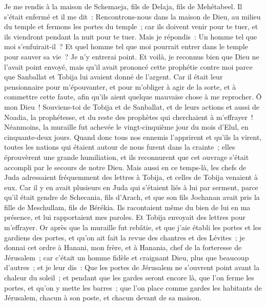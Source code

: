 \begin{multicols}{2}
Je me rendis à la maison de Schemaeja, fils de Delaja, fils de Mehétabeel. Il s'était enfermé et il me dit~: Rencontrons-nous dans la maison de Dieu, au milieu du temple et fermons les portes du temple~; car ils doivent venir pour te tuer, et ils viendront pendant la nuit pour te tuer.
Mais je répondis~: Un homme tel que moi s'enfuirait-il~? Et quel homme tel que moi pourrait entrer dans le temple pour sauver sa vie~? Je n'y entrerai point.
Et voilà, je reconnus bien que Dieu ne l'avait point envoyé, mais qu'il avait prononcé cette prophétie contre moi parce que Sanballat et Tobija lui avaient donné de l'argent.
Car il était leur pensionnaire pour m'épouvanter, et pour m'obliger à agir de la sorte, et à commettre cette faute, afin qu'ils aient quelque mauvaise chose à me reprocher.
Ô mon Dieu~! Souviens-toi de Tobija et de Sanballat, et de leurs actions et aussi de Noadia, la prophétesse, et du reste des prophètes qui cherchaient à m'effrayer~!
Néanmoins, la muraille fut achevée le vingt-cinquième jour du mois d'Elul, en cinquante-deux jours.
Quand donc tous nos ennemis l'apprirent et qu'ils la virent, toutes les nations qui étaient autour de nous furent dans la crainte~; elles éprouvèrent une grande humiliation, et ils reconnurent que cet ouvrage s'était accompli par le secours de notre Dieu.
Mais aussi en ce temps-là, les chefs de Juda adressaient fréquemment des lettres à Tobija, et celles de Tobija venaient à eux.
Car il y en avait plusieurs en Juda qui s'étaient liés à lui par serment, parce qu'il était gendre de Schecania, fils d'Arach, et que son fils Jochanan avait pris la fille de Meschullam, fils de Bérékia.
Ils racontaient même du bien de lui en ma présence, et lui rapportaient mes paroles. Et Tobija envoyait des lettres pour m'effrayer.
\VerseOne{}Or après que la muraille fut rebâtie, et que j’aie établi les portes et les gardiens des portes, et qu'on ait fait la revue des chantres et des Lévites~; 
je donnai cet ordre à Hanani, mon frère, et à Hanania, chef de la forteresse de Jérusalem~; car c'était un homme fidèle et craignant Dieu, plus que beaucoup d'autres~;
et je leur dis~: Que les portes de Jérusalem ne s'ouvrent point avant la chaleur du soleil~; et pendant que les gardes seront encore là, que l'on ferme les portes, et qu'on y mette les barres~; que l'on place comme gardes les habitants de Jérusalem, chacun à son poste, et chacun devant de sa maison.

\end{multicols}
